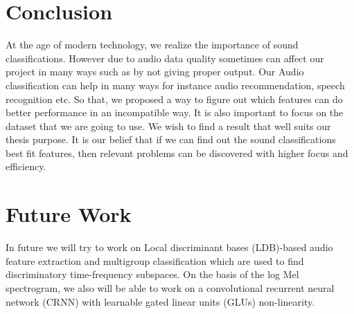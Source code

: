 \section{Conclusion} 
At the age of modern technology, we realize the importance of sound classifications. However due to audio data quality sometimes can affect our project in many ways such as by not giving proper output. Our Audio classification can help in many ways for instance audio recommendation, speech recognition etc. So that, we proposed a way to figure out which features can do better performance in an incompatible way. It is also important to focus on the dataset that we are going to use. We wish to find a result that well suits our thesis purpose. It is our belief that if we can find out the sound classifications best fit features, then relevant problems can be discovered with higher focus and efficiency.
\section{Future Work}
In future we will try to work on Local discriminant bases (LDB)-based audio feature extraction and multigroup classification which are used to find discriminatory time-frequency subspaces. On the basis of the log Mel spectrogram, we also will be able to work on a convolutional recurrent neural network (CRNN) with learnable gated linear units (GLUs) non-linearity.